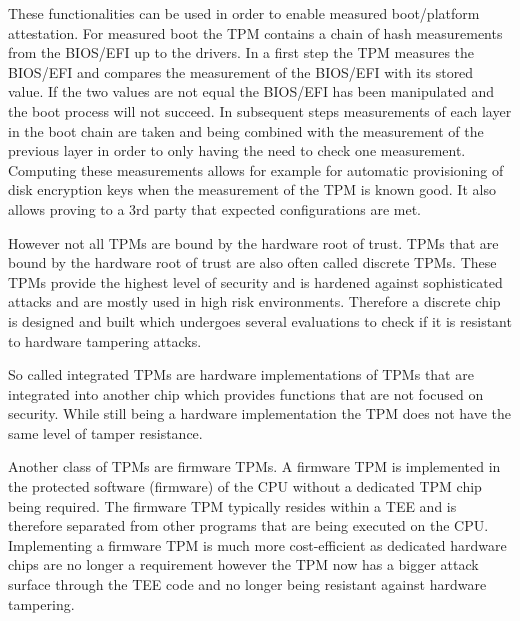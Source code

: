 \documentclass[sigplan,screen,nonacm]{acmart}
\begin{document}
These functionalities can be used in order to enable measured boot/platform attestation.
For measured boot the TPM contains a chain of hash measurements from the BIOS/EFI up to the drivers.
In a first step the TPM measures the BIOS/EFI and compares the measurement of the BIOS/EFI with its stored value.
If the two values are not equal the BIOS/EFI has been manipulated and the boot process will not succeed.
In subsequent steps measurements of each layer in the boot chain are taken and being combined with the measurement of the previous layer in order to only having the need to check one measurement.
Computing these measurements allows for example for automatic provisioning of disk encryption keys when the measurement of the TPM is known good.
It also allows proving to a 3rd party that expected configurations are met.

However not all TPMs are bound by the hardware root of trust.
TPMs that are bound by the hardware root of trust are also often called discrete TPMs.
These TPMs provide the highest level of security and is hardened against sophisticated attacks and are mostly used in high risk environments.
Therefore a discrete chip is designed and built which undergoes several evaluations to check if it is resistant to hardware tampering attacks\cite{TPM-short}.

So called integrated TPMs are hardware implementations of TPMs that are integrated into another chip which provides functions that are not focused on security.
While still being a hardware implementation the TPM does not have the same level of tamper resistance\cite{TPM-short}.

Another class of TPMs are firmware TPMs.
A firmware TPM is implemented in the protected software (firmware) of the CPU without a dedicated TPM chip being required.
The firmware TPM typically resides within a TEE and is therefore separated from other programs that are being executed on the CPU.
Implementing a firmware TPM is much more cost-efficient as dedicated hardware chips are no longer a requirement however the TPM now has a bigger attack surface through the TEE code and no longer being resistant against hardware tampering\cite{TPM-short}.
\end{document}
